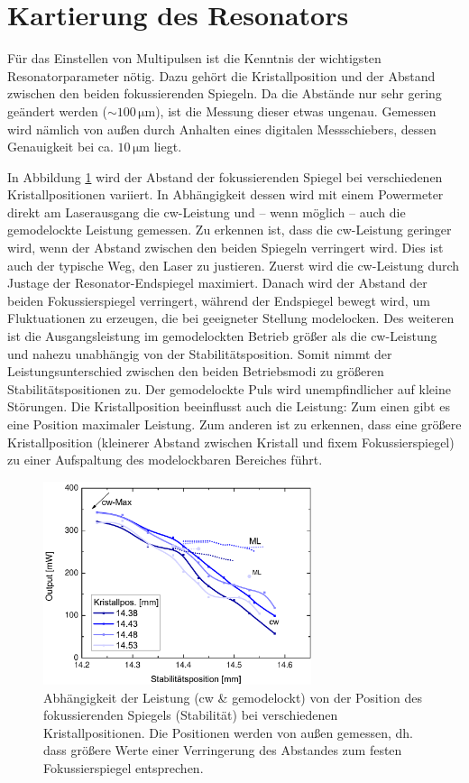 \documentclass[bachelor,       %
               twoside,        %
               BCOR10mm,       %
               english,ngerman, %
               ]{GAUBM}
\begin{document}
\section{Kartierung des Resonators}
Für das Einstellen von Multipulsen ist die Kenntnis der wichtigsten Resonatorparameter nötig.
Dazu gehört die Kristallposition und der Abstand zwischen den beiden fokussierenden Spiegeln.
Da die Abstände nur sehr gering geändert werden ($\sim 100\,\si{\micro\meter}$), ist die Messung dieser etwas ungenau.
Gemessen wird nämlich von außen durch Anhalten eines digitalen Messschiebers, dessen Genauigkeit  bei ca. $10\,\si{\micro\meter}$ liegt.

In Abbildung \ref{fig:map} wird der Abstand der fokussierenden Spiegel bei verschiedenen Kristallpositionen variiert.
In Abhängigkeit dessen wird mit einem Powermeter direkt am Laserausgang die cw-Leistung und -- wenn möglich -- auch die gemodelockte Leistung gemessen.
Zu erkennen ist, dass die cw-Leistung geringer wird, wenn der Abstand zwischen den beiden Spiegeln verringert wird.
Dies ist auch der typische Weg, den Laser zu justieren.
Zuerst wird die cw-Leistung durch Justage der Resonator-Endspiegel maximiert.
Danach wird der Abstand der beiden Fokussierspiegel verringert, während der Endspiegel bewegt wird, um Fluktuationen zu erzeugen, die bei geeigneter Stellung modelocken.
Des weiteren ist die Ausgangsleistung im gemodelockten Betrieb größer als die cw-Leistung und nahezu unabhängig von der Stabilitätsposition.
Somit nimmt der Leistungsunterschied zwischen den beiden Betriebsmodi zu größeren Stabilitätspositionen zu.
Der gemodelockte Puls wird unempfindlicher auf kleine Störungen.
Die Kristallposition beeinflusst auch die Leistung: Zum einen gibt es eine Position maximaler Leistung.
Zum anderen ist zu erkennen, dass eine größere Kristallposition (kleinerer Abstand zwischen Kristall und fixem Fokussierspiegel) zu einer Aufspaltung des modelockbaren Bereiches führt.

\begin{figure}[!htb]
	\centering
	\includegraphics[width=0.7\textwidth]{figures/map.pdf}
	\caption{Abhängigkeit der Leistung (cw \& gemodelockt) von der Position des fokussierenden Spiegels (Stabilität) bei verschiedenen Kristallpositionen.
	Die Positionen werden von außen gemessen, dh. dass größere Werte einer Verringerung des Abstandes zum festen Fokussierspiegel entsprechen.}
	\label{fig:map}
\end{figure}
\end{document}
